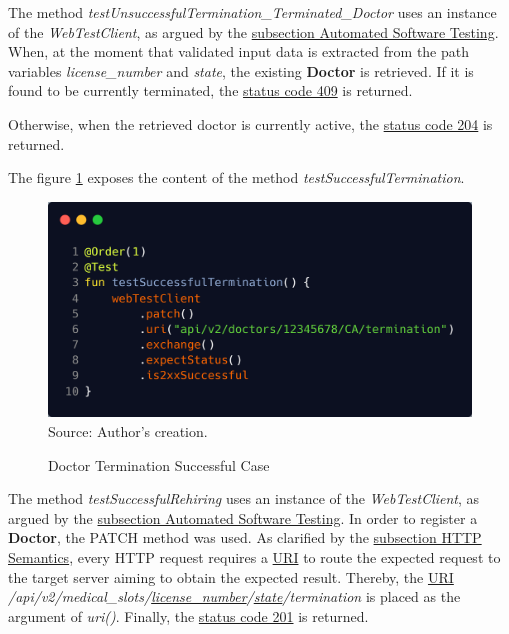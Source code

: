 The method \textit{testUnsuccessfulTermination\_Terminated\_Doctor} uses an instance of the \textit{WebTestClient}, as argued by the \hyperref[subsection:automated_software_testing]{subsection Automated Software Testing}. When, at the moment that validated input data is extracted from the path variables \textit{license\_number} and \textit{state}, the existing \textbf{Doctor} is retrieved. If it is found to be currently terminated, the \hyperref[tab:summary_http_status_codes]{status code 409} is returned.

Otherwise, when the retrieved doctor is currently active, the \hyperref[appendix:glossary]{status code 204} is returned. 

The figure \ref{fig:doctor_termination_successful_integration_test} exposes the content of the method \textit{testSuccessfulTermination}.

\begin{figure}[H]
	\centering
	\caption{Doctor Termination Successful Case}
	\includegraphics[width=1\linewidth]{figures/doctor_termination_successful_integration_test.png}
	\\ \footnotesize Source: Author's creation.
	\label{fig:doctor_termination_successful_integration_test}
\end{figure}

The method \textit{testSuccessfulRehiring} uses an instance of the \textit{WebTestClient}, as argued by the \hyperref[subsection:automated_software_testing]{subsection Automated Software Testing}. In order to register a \textbf{Doctor}, the PATCH method was used. As clarified by the \hyperref[subsection:http_semantics]{subsection HTTP Semantics}, every HTTP request requires a \hyperref[appendix:glossary]{URI} to route the expected request to the target server aiming to obtain the expected result. Thereby, the \hyperref[appendix:glossary]{URI} \textit{/api/v2/medical\_slots/\underline{license\_number}/\underline{state}/termination} is placed as the argument of \textit{uri()}. Finally, the \hyperref[tab:summary_http_status_codes]{status code 201} is returned.


